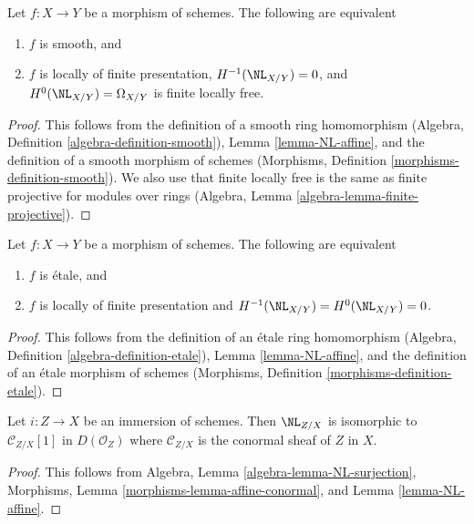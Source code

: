\begin{lemma}
\label{lemma-NL-smooth}
Let $f : X \to Y$ be a morphism of schemes. The following are equivalent
\begin{enumerate}
\item $f$ is smooth, and
\item $f$ is locally of finite presentation,
$H^{-1}(\NL_{X/Y}) = 0$, and $H^0(\NL_{X/Y}) = \Omega_{X/Y}$
is finite locally free.
\end{enumerate}
\end{lemma}

\begin{proof}
This follows from the definition of a smooth ring homomorphism
(Algebra, Definition \ref{algebra-definition-smooth}),
Lemma \ref{lemma-NL-affine}, and
the definition of a smooth morphism of schemes
(Morphisms, Definition \ref{morphisms-definition-smooth}).
We also use that finite locally free is the same as
finite projective for modules over rings
(Algebra, Lemma \ref{algebra-lemma-finite-projective}).
\end{proof}

\begin{lemma}
\label{lemma-NL-etale}
Let $f : X \to Y$ be a morphism of schemes. The following are equivalent
\begin{enumerate}
\item $f$ is \'etale, and
\item $f$ is locally of finite presentation and
$H^{-1}(\NL_{X/Y}) = H^0(\NL_{X/Y}) = 0$.
\end{enumerate}
\end{lemma}

\begin{proof}
This follows from the definition of an \'etale ring homomorphism
(Algebra, Definition \ref{algebra-definition-etale}),
Lemma \ref{lemma-NL-affine}, and
the definition of an \'etale morphism of schemes
(Morphisms, Definition \ref{morphisms-definition-etale}).
\end{proof}


\begin{lemma}
\label{lemma-NL-immersion}
Let $i : Z \to X$ be an immersion of schemes. Then $\NL_{Z/X}$
is isomorphic to $\mathcal{C}_{Z/X}[1]$ in $D(\mathcal{O}_Z)$
where $\mathcal{C}_{Z/X}$ is the conormal sheaf of $Z$ in $X$.
\end{lemma}

\begin{proof}
This follows from Algebra, Lemma \ref{algebra-lemma-NL-surjection},
Morphisms, Lemma \ref{morphisms-lemma-affine-conormal}, and
Lemma \ref{lemma-NL-affine}.
\end{proof}

